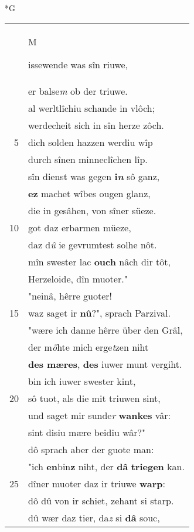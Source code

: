 \documentclass[8pt,a4paper,notitlepage]{article}
\begin{document}
\begin{table}[ht]
\begin{minipage}[t]{0.5\linewidth}
\small
\begin{center}*G
\end{center}
\begin{tabular}{rl}
 & \begin{large}M\end{large}issewende was sîn riuwe,\\ 
 & er balse\textit{m} ob der triuwe.\\ 
 & al werltlîchiu schande in vlôch;\\ 
 & werdecheit sich in sîn herze zôch.\\ 
5 & dich solden hazzen werdiu wîp\\ 
 & durch sînen minneclîchen lîp.\\ 
 & sîn dienst was gegen \textbf{i\textit{n}} sô ganz,\\ 
 & \textbf{ez} machet wîbes ougen glanz,\\ 
 & die in gesâhen, von sîner süeze.\\ 
10 & got daz erbarmen müeze,\\ 
 & daz d\textit{û} ie gevrumtest solhe nôt.\\ 
 & mîn swester lac \textbf{ouch} nâch dir tôt,\\ 
 & Herzeloide, dîn muoter."\\ 
 & "neinâ, hêrre guoter!\\ 
15 & waz saget ir \textbf{nû}?", sprach Parzival.\\ 
 & "wære ich danne hêrre über den Grâl,\\ 
 & der m\textit{ö}hte mich erge\textit{t}zen niht\\ 
 & \textbf{des mæres}, \textbf{des} iuwer munt vergiht.\\ 
 & bin ich iuwer swester kint,\\ 
20 & sô tuot, als die mit triuwen sint,\\ 
 & und saget mir sunde\textit{r} \textbf{wankes} vâr:\\ 
 & sint disiu mære beidiu wâr?"\\ 
 & dô sprach aber der guote man:\\ 
 & "ich \textbf{en}bin\textbf{z} niht, der \textbf{dâ} \textbf{triegen} kan.\\ 
25 & dîner muoter daz ir triuwe \textbf{warp}:\\ 
 & dô dû von ir schiet, zehant si starp.\\ 
 & dû wær daz tier, da\textit{z} si \textbf{dâ} souc,\\ 

\end{tabular}
\end{minipage}
\end{table}
\end{document}
